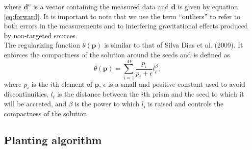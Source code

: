 \documentclass{segabs}
\begin{document}
where $\mathbf{d}^{o}$ is a vector containing the measured data and $\mathbf{d}$ is given by
equation \ref{eq:forward}. It is important to note that we use the term ``outliers'' to refer
to both errors in the measurements and to interfering gravitational effects produced by
non-targeted sources.
\\[0.2cm]
The regularizing function $\theta(\mathbf{p})$ is similar to that of Silva Dias et al. (2009).
It enforces the compactness of the solution around the seeds and is defined as
\begin{equation}
\theta(\mathbf{p}) = \sum\limits_{i=1}^{M} \dfrac{p_i}{p_i + \epsilon} l_i^{\beta},
\end{equation}
where $p_i$ is the $i$th element of $\mathbf{p}$, $\epsilon$ is a small and positive constant
used to avoid discontinuities, $l_i$ is the distance between the $i$th prism and the seed
to which it will be accreted, and $\beta$ is the power to which $l_i$ is raised and
controls the compactness of the solution.

\subsection{Planting algorithm}
\end{document}
